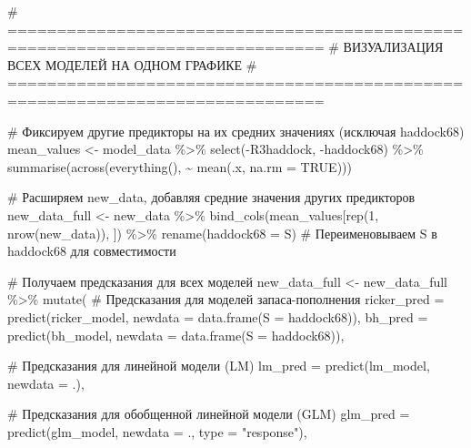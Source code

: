 \documentclass[
  letterpaper,
  DIV=11,
  numbers=noendperiod]{scrreprt}
\newenvironment{Shaded}{\begin{snugshade}}{\end{snugshade}}
\newcommand{\AttributeTok}[1]{\textcolor[rgb]{0.40,0.45,0.13}{#1}}
\newcommand{\CommentTok}[1]{\textcolor[rgb]{0.37,0.37,0.37}{#1}}
\newcommand{\ConstantTok}[1]{\textcolor[rgb]{0.56,0.35,0.01}{#1}}
\newcommand{\DecValTok}[1]{\textcolor[rgb]{0.68,0.00,0.00}{#1}}
\newcommand{\FunctionTok}[1]{\textcolor[rgb]{0.28,0.35,0.67}{#1}}
\newcommand{\NormalTok}[1]{\textcolor[rgb]{0.00,0.23,0.31}{#1}}
\newcommand{\OtherTok}[1]{\textcolor[rgb]{0.00,0.23,0.31}{#1}}
\newcommand{\SpecialCharTok}[1]{\textcolor[rgb]{0.37,0.37,0.37}{#1}}
\newcommand{\StringTok}[1]{\textcolor[rgb]{0.13,0.47,0.30}{#1}}
\begin{document}
\begin{Shaded}
\begin{Highlighting}[]
\CommentTok{\# ==============================================================================}
\CommentTok{\# ВИЗУАЛИЗАЦИЯ ВСЕХ МОДЕЛЕЙ НА ОДНОМ ГРАФИКЕ }
\CommentTok{\# ==============================================================================}

\CommentTok{\# Фиксируем другие предикторы на их средних значениях (исключая haddock68)}
\NormalTok{mean\_values }\OtherTok{\textless{}{-}}\NormalTok{ model\_data }\SpecialCharTok{\%\textgreater{}\%}
  \FunctionTok{select}\NormalTok{(}\SpecialCharTok{{-}}\NormalTok{R3haddock, }\SpecialCharTok{{-}}\NormalTok{haddock68) }\SpecialCharTok{\%\textgreater{}\%}
  \FunctionTok{summarise}\NormalTok{(}\FunctionTok{across}\NormalTok{(}\FunctionTok{everything}\NormalTok{(), }\SpecialCharTok{\textasciitilde{}} \FunctionTok{mean}\NormalTok{(.x, }\AttributeTok{na.rm =} \ConstantTok{TRUE}\NormalTok{)))}

\CommentTok{\# Расширяем new\_data, добавляя средние значения других предикторов}
\NormalTok{new\_data\_full }\OtherTok{\textless{}{-}}\NormalTok{ new\_data }\SpecialCharTok{\%\textgreater{}\%}
  \FunctionTok{bind\_cols}\NormalTok{(mean\_values[}\FunctionTok{rep}\NormalTok{(}\DecValTok{1}\NormalTok{, }\FunctionTok{nrow}\NormalTok{(new\_data)), ]) }\SpecialCharTok{\%\textgreater{}\%}
  \FunctionTok{rename}\NormalTok{(}\AttributeTok{haddock68 =}\NormalTok{ S)  }\CommentTok{\# Переименовываем S в haddock68 для совместимости}

\CommentTok{\# Получаем предсказания для всех моделей}
\NormalTok{new\_data\_full }\OtherTok{\textless{}{-}}\NormalTok{ new\_data\_full }\SpecialCharTok{\%\textgreater{}\%}
  \FunctionTok{mutate}\NormalTok{(}
    \CommentTok{\# Предсказания для моделей запаса{-}пополнения}
    \AttributeTok{ricker\_pred =} \FunctionTok{predict}\NormalTok{(ricker\_model, }\AttributeTok{newdata =} \FunctionTok{data.frame}\NormalTok{(}\AttributeTok{S =}\NormalTok{ haddock68)),}
    \AttributeTok{bh\_pred =} \FunctionTok{predict}\NormalTok{(bh\_model, }\AttributeTok{newdata =} \FunctionTok{data.frame}\NormalTok{(}\AttributeTok{S =}\NormalTok{ haddock68)),}
    
    \CommentTok{\# Предсказания для линейной модели (LM)}
    \AttributeTok{lm\_pred =} \FunctionTok{predict}\NormalTok{(lm\_model, }\AttributeTok{newdata =}\NormalTok{ .),}
    
    \CommentTok{\# Предсказания для обобщенной линейной модели (GLM)}
    \AttributeTok{glm\_pred =} \FunctionTok{predict}\NormalTok{(glm\_model, }\AttributeTok{newdata =}\NormalTok{ ., }\AttributeTok{type =} \StringTok{"response"}\NormalTok{),}
    

\end{Highlighting}
\end{Shaded}
\end{document}
